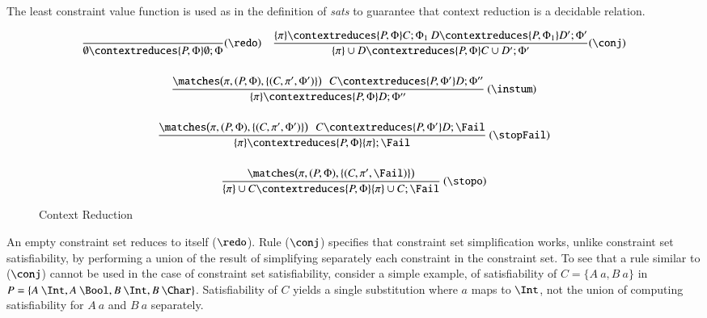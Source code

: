 \documentclass[review]{elsarticle}
\begin{document}
The least constraint value function is used as in the definition of
{\it sats\/} to guarantee that context reduction is a decidable
relation.

\begin{figure}

  \[ \begin{array}{c}
       \begin{array}{cc}
         \displaystyle\frac{}
                           {\emptyset \contextreduces {P,\Phi} \emptyset;\Phi} (\redo) &
         \displaystyle\frac{\{ \pi \} \contextreduces {P,\Phi} C;\Phi_1  \:
                            D \contextreduces {P,\Phi_1} D';\Phi'}
      	                   {\{ \pi \} \cup D \contextreduces {P,\Phi} C \cup D';\Phi'} (\conj)
      \end{array}\\[.8cm]

       \displaystyle\frac{\matches\bigl(\pi,(P,\Phi),\{(C,\pi',\Phi')\}\bigr)
                           \:\:\: C \contextreduces {P,\Phi'} D;\Phi''}
       	                 {\{ \pi \} \contextreduces {P,\Phi} D;\Phi''}\: (\instum)\\[.8cm]
       \displaystyle\frac{\matches\bigl(\pi,(P,\Phi),\{(C,\pi',\Phi')\}\bigr) \:\:\:
                            C \contextreduces {P,\Phi'} D;\Fail}
       	                 {\{ \pi \} \contextreduces {P,\Phi} \{ \pi \}; \Fail} \: (\stopFail) \\[.8cm]
       \begin{array}{c}
       \displaystyle\frac{\matches\bigl(\pi,(P,\Phi),\{(C,\pi',\Fail)\}\bigr)}
       	                 {\{ \pi \} \cup C \contextreduces {P,\Phi} \{ \pi \}\cup C;\Fail} \: (\stopo)
       \end{array}
    \end{array}
  \]
\caption{Context Reduction}
\label{Context-reduction-fig}
\end{figure}

An empty constraint set reduces to itself ($\redo$).  Rule ($\conj$)
specifies that constraint set simplification works, unlike constraint
set satisfiability, by performing a union of the result of
simplifying separately each constraint in the constraint set.
To see that a rule similar to ($\conj$) cannot be used in the case of
constraint set satisfiability, consider a simple example, of
satisfiability of $C = \{A\:a, B\: a\}$ in $P = \{A\:\Int,A\:
\Bool,B\: \Int,B\: \Char\}$. Satisfiability of $C$ yields a single
substitution where $a$ maps to $\Int$, not the union of computing
satisfiability for $A\:a$ and $B\:a$ separately.
\end{document}
